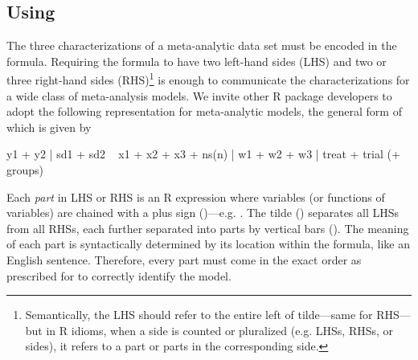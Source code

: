 \subsection{Using }\label{subsec:using-formula}
The three characterizations of a meta-analytic data set must be encoded in the formula. Requiring the formula to have two left-hand sides (LHS) and two or three right-hand sides (RHS)\footnote{Semantically, the LHS should refer to the entire left of tilde---same for RHS---but in R idioms, when a side is counted or pluralized (e.g. LHSs, RHSs, or sides), it refers to a part or parts in the corresponding side.} is enough to communicate the characterizations for a wide class of meta-analysis models. We invite other R package developers to adopt the following representation for meta-analytic models, the general form of which is given by
\begin{example}
  y1 + y2 | sd1 + sd2 ~ x1 + x2 + x3 + ns(n) | w1 + w2 + w3 | treat + trial (+ groups)
\end{example}
Each \emph{part} in LHS or RHS is an R expression where variables (or functions of variables) are chained with a plus sign (\code{+})---e.g. . The tilde (\code{\textasciitilde}) separates all LHSs from all RHSs, each further separated into parts by vertical bars (\code{|}). The meaning of each part is syntactically determined by its location within the formula, like an English sentence. Therefore, every part must come in the exact order as prescribed for  to correctly identify the model.
